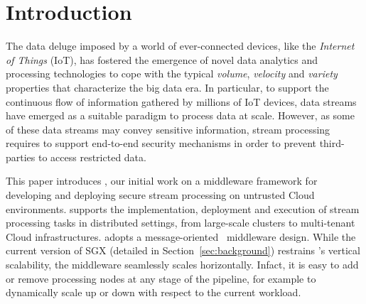 \section{Introduction}\label{sec:introduction}

The data deluge imposed by a world of ever-connected devices, like the \emph{Internet of Things} (IoT), has fostered the emergence of novel data analytics and processing technologies to cope with the typical \emph{volume}, \emph{velocity} and \emph{variety} properties that characterize the big data era.
In particular, to support the continuous flow of information gathered by millions of IoT devices, data streams have emerged as a suitable paradigm to process data at scale.
However, as some of these data streams may convey sensitive information, stream processing requires to support end-to-end security mechanisms in order to prevent third-parties to access restricted data.

This paper introduces \SYS{}, our initial work on a middleware framework for developing and deploying secure stream processing on untrusted Cloud environments.
\SYS{} supports the implementation, deployment and execution of stream processing tasks in distributed settings, from large-scale clusters to multi-tenant Cloud infrastructures.
\SYS{} adopts a message-oriented~\cite{mom} middleware design.
While the current version of SGX (detailed in Section~\ref{sec:background}) restrains \SYS's vertical scalability, the middleware seamlessly scales horizontally. 
Infact, it is easy to add or remove processing nodes at any stage of the pipeline, for example to dynamically scale up or down with respect to the current workload.


